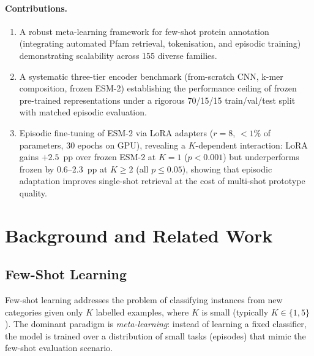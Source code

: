\documentclass[11pt,a4paper]{article}
\begin{document}
\paragraph{Contributions.}
\begin{enumerate}[leftmargin=*,noitemsep]
  \item A robust meta-learning framework for few-shot protein annotation (integrating automated Pfam
        retrieval, tokenisation, and episodic training) demonstrating scalability across 155 diverse families.
  \item A systematic three-tier encoder benchmark (from-scratch CNN, k-mer
        composition, frozen ESM-2) establishing the performance ceiling of
        frozen pre-trained representations under a rigorous 70/15/15
        train/val/test split with matched episodic evaluation.
  \item Episodic fine-tuning of ESM-2 via LoRA adapters ($r=8$, $<1\%$ of
        parameters, 30 epochs on GPU), revealing a $K$-dependent interaction:
        LoRA gains $+2.5$~pp over frozen ESM-2 at $K=1$ ($p < 0.001$) but
        underperforms frozen by 0.6--2.3~pp at $K \geq 2$ (all $p \leq 0.05$),
        showing that episodic adaptation improves single-shot retrieval at the
        cost of multi-shot prototype quality.
\end{enumerate}

\section{Background and Related Work}
\label{sec:related}

\subsection{Few-Shot Learning}

Few-shot learning addresses the problem of classifying instances from new
categories given only $K$ labelled examples, where $K$ is small (typically
$K \in \{1, 5\}$).  The dominant paradigm is \emph{meta-learning}: instead of
learning a fixed classifier, the model is trained over a distribution of small
tasks (episodes) that mimic the few-shot evaluation scenario.
\end{document}
